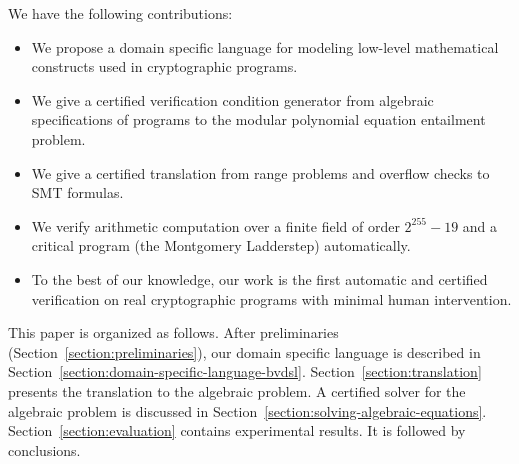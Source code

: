 We have the following contributions:
\begin{itemize}
\item We propose a domain specific language \bvdsl for modeling low-level
  mathematical constructs used in cryptographic programs.
\item We give a certified verification condition generator from
  algebraic specifications of programs to the modular polynomial
  equation entailment problem.
\item We give a certified translation from range problems and overflow checks to SMT formulas.
\item We verify arithmetic computation over a finite field of order
  $2^{255} - 19$ and a
  critical program (the Montgomery Ladderstep) automatically.
\item To the best of our knowledge, our work is the first automatic
  and certified verification on real cryptographic programs with
  minimal human intervention.
\end{itemize}




This paper is organized as follows. After preliminaries
(Section~\ref{section:preliminaries}), our domain specific
language is described in Section~\ref{section:domain-specific-language-bvdsl}.
Section~\ref{section:translation}
presents the translation to the algebraic
problem. A certified solver for the algebraic problem is discussed in
Section~\ref{section:solving-algebraic-equations}.
Section~\ref{section:evaluation} contains experimental results. It is
followed by conclusions.

